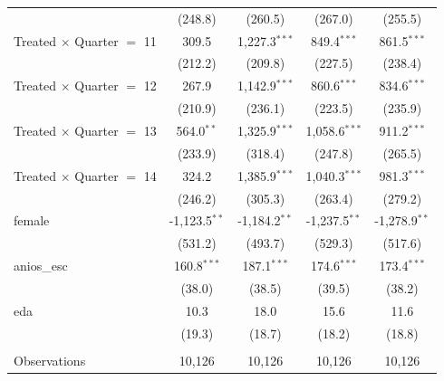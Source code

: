 \begin{longtable}{lcccc}
                                  & (248.8)                              & (260.5)         & (267.0)         & (255.5)         \\
  Treated $\times$ Quarter $=$ 11 & 309.5                                & 1,227.3$^{***}$ & 849.4$^{***}$   & 861.5$^{***}$   \\
                                  & (212.2)                              & (209.8)         & (227.5)         & (238.4)         \\
  Treated $\times$ Quarter $=$ 12 & 267.9                                & 1,142.9$^{***}$ & 860.6$^{***}$   & 834.6$^{***}$   \\
                                  & (210.9)                              & (236.1)         & (223.5)         & (235.9)         \\
  Treated $\times$ Quarter $=$ 13 & 564.0$^{**}$                         & 1,325.9$^{***}$ & 1,058.6$^{***}$ & 911.2$^{***}$   \\
                                  & (233.9)                              & (318.4)         & (247.8)         & (265.5)         \\
  Treated $\times$ Quarter $=$ 14 & 324.2                                & 1,385.9$^{***}$ & 1,040.3$^{***}$ & 981.3$^{***}$   \\
                                  & (246.2)                              & (305.3)         & (263.4)         & (279.2)         \\
  female                          & -1,123.5$^{**}$                      & -1,184.2$^{**}$ & -1,237.5$^{**}$ & -1,278.9$^{**}$ \\
                                  & (531.2)                              & (493.7)         & (529.3)         & (517.6)         \\
  anios\_esc                      & 160.8$^{***}$                        & 187.1$^{***}$   & 174.6$^{***}$   & 173.4$^{***}$   \\
                                  & (38.0)                               & (38.5)          & (39.5)          & (38.2)          \\
  eda                             & 10.3                                 & 18.0            & 15.6            & 11.6            \\
                                  & (19.3)                               & (18.7)          & (18.2)          & (18.8)          \\
  \\
  Observations                    & 10,126                               & 10,126          & 10,126          & 10,126          \\

\end{longtable}
